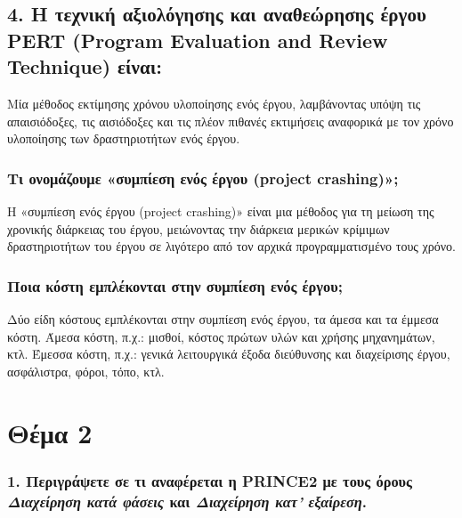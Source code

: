\documentclass[12pt]{turabian-researchpaper}
\begin{document}
\subsection{4. H τεχνική αξιολόγησης και αναθεώρησης έργου PERT (Program Evaluation and Review Technique) είναι:}
Μία μέθοδος εκτίμησης χρόνου υλοποίησης ενός έργου, λαμβάνοντας υπόψη τις απαισιόδοξες, τις αισιόδοξες και τις πλέον πιθανές εκτιμήσεις αναφορικά με τον χρόνο υλοποίησης των δραστηριοτήτων ενός έργου.

\subsubsection{Τι ονομάζουμε «συμπίεση ενός έργου (project crashing)»;}

Η «συμπίεση ενός έργου (project crashing)» είναι μια μέθοδος για τη μείωση της χρονικής διάρκειας του έργου, μειώνοντας την διάρκεια μερικών κρίμιμων δραστηριοτήτων του έργου σε λιγότερο από τον αρχικά προγραμματισμένο τους χρόνο.

\subsubsection{Ποια κόστη εμπλέκονται στην συμπίεση ενός έργου;}

Δύο είδη κόστους εμπλέκονται στην συμπίεση ενός έργου, τα άμεσα και τα έμμεσα κόστη. Άμεσα κόστη, π.χ.: μισθοί, κόστος πρώτων υλών και χρήσης μηχανημάτων, κτλ. Έμεσσα κόστη, π.χ.: γενικά λειτουργικά έξοδα διεύθυνσης και διαχείρισης έργου, ασφάλιστρα, φόροι, τόπο, κτλ.

\section{Θέμα 2}

\subsubsection{1. Περιγράψετε σε τι αναφέρεται η PRINCE2 με τους όρους \textit{Διαχείρηση κατά φάσεις} και \textit{Διαχείρηση κατ' εξαίρεση}.}
\end{document}
